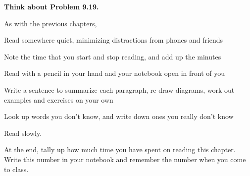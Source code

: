 {\bf Think about Problem 9.19.}

\noindent As with the previous chapters,
\blist{0.0in}
\item Read somewhere quiet, minimizing distractions from phones and friends
\item Note the time that you start and stop reading, and add up the minutes
\item Read with a pencil in your hand and your notebook open in front of you
\item Write a sentence to summarize each paragraph, re-draw diagrams, work out examples and exercises on your own
\item Look up words you don't know, and write down ones you really don't know
\item Read slowly. 
\item At the end, tally up how much time you have spent on reading this chapter.
Write this number in your notebook and remember the number when you come to class.
\elist

\vfill          %
